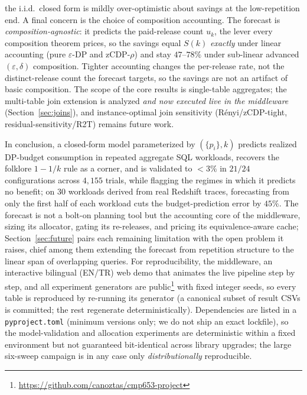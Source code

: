 \documentclass[sigconf,nonacm]{acmart}
\newcommand{\eps}{\varepsilon}
\begin{document}
the i.i.d.\ closed form is mildly over-optimistic about savings at the low-repetition end. A final concern is the choice of composition accounting. The forecast is \emph{composition-agnostic}: it predicts the paid-release count $u_k$, the lever every composition theorem prices, so the savings equal $S(k)$ \emph{exactly} under linear accounting (pure $\eps$-DP and zCDP-$\rho$) and stay $47$--$78\%$ under sub-linear advanced $(\eps,\delta)$ composition. Tighter accounting changes the per-release rate, not the distinct-release count the forecast targets, so the savings are not an artifact of basic composition. The scope of the core results is single-table aggregates; the multi-table join extension is analyzed \emph{and now executed live in the middleware} (Section~\ref{sec:joins}), and instance-optimal join sensitivity (Rényi/zCDP-tight, residual-sensitivity/R2T) remains future work.

In conclusion, a closed-form model parameterized by $(\{p_i\},k)$ predicts realized DP-budget consumption in repeated aggregate SQL workloads, recovers the folklore $1-1/k$ rule as a corner, and is validated to $<3\%$ in $21/24$ configurations across $4{,}155$ trials, while flagging the regimes in which it predicts no benefit; on $30$ workloads derived from real Redshift traces, forecasting from only the first half of each workload cuts the budget-prediction error by $45\%$. The forecast is not a bolt-on planning tool but the accounting core of the middleware, sizing its allocator, gating its re-releases, and pricing its equivalence-aware cache; Section~\ref{sec:future} pairs each remaining limitation with the open problem it raises, chief among them extending the forecast from repetition structure to the linear span of overlapping queries. For reproducibility, the middleware, an interactive bilingual (EN/TR) web demo that animates the live pipeline step by step, and all experiment generators are public\footnote{\url{https://github.com/canoztas/cmp653-project}} with fixed integer seeds, so every table is reproduced by re-running its generator (a canonical subset of result CSVs is committed; the rest regenerate deterministically). Dependencies are listed in a \texttt{pyproject.toml} (minimum versions only; we do not ship an exact lockfile), so the model-validation and allocation experiments are deterministic within a fixed environment but not guaranteed bit-identical across library upgrades; the large six-sweep campaign is in any case only \emph{distributionally} reproducible.

\clearpage
\appendix
\end{document}
